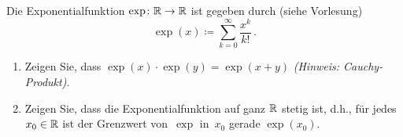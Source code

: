 \bigskip

\begin{aufg}[6 Punkte]
Die Exponentialfunktion $\exp\colon\mathbb{R}\to\mathbb{R}$ ist gegeben durch (siehe Vorlesung)
\[
\exp(x)\coloneqq \sum_{k=0}^{\infty}\frac{x^k}{k!}\,. 
\]
\begin{enumerate}[label=$\mathrm{(\roman*)}$, ref=$\mathrm{\roman*}$]
\item Zeigen Sie, dass $\exp(x)\cdot \exp(y)=\exp(x+y)$ \emph{(Hinweis: Cauchy-Produkt)}.
\item Zeigen Sie, dass die Exponentialfunktion auf ganz $\mathbb{R}$ stetig ist, d.h., f\"ur jedes~$x_0\in\mathbb{R}$ ist der Grenzwert von~$\exp$ in~$x_0$ gerade $\exp(x_0)$.
\end{enumerate}
\end{aufg}
 
\bigskip

